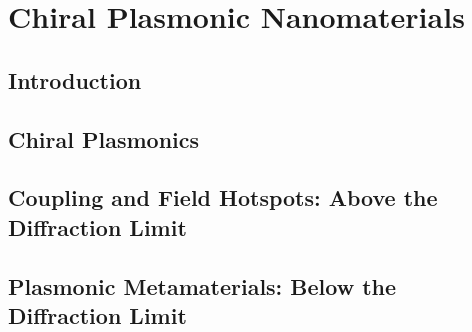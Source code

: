 \chapter{Chiral Plasmonic Nanomaterials}\label{sec:background:Plasmonics}

\section{Introduction}

\section{Chiral Plasmonics}

\section{Coupling and Field Hotspots: Above the Diffraction Limit}

\section{Plasmonic Metamaterials: Below the Diffraction Limit}\label{sec:background:Plasmonics:Metamaterials}